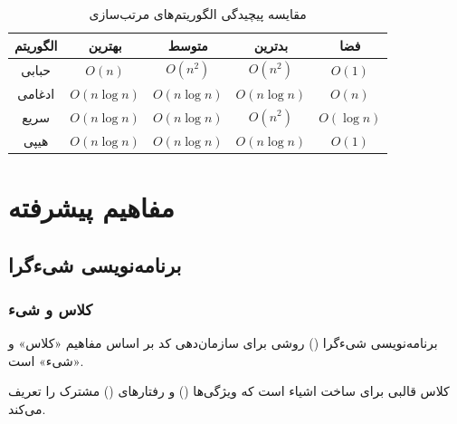 \documentclass{matinbook}
\begin{document}
\begin{table}[h]
\centering
\caption{مقایسه پیچیدگی الگوریتم‌های مرتب‌سازی}
\label{tab:sorting-comparison}
\begin{tabular}{|c|c|c|c|c|}
\hline
\textbf{الگوریتم} & \textbf{بهترین} & \textbf{متوسط} & \textbf{بدترین} & \textbf{فضا} \\
\hline
حبابی & $O(n)$ & $O(n^2)$ & $O(n^2)$ & $O(1)$ \\
ادغامی & $O(n \log n)$ & $O(n \log n)$ & $O(n \log n)$ & $O(n)$ \\
سریع & $O(n \log n)$ & $O(n \log n)$ & $O(n^2)$ & $O(\log n)$ \\
هیپی & $O(n \log n)$ & $O(n \log n)$ & $O(n \log n)$ & $O(1)$ \\
\hline
\end{tabular}
\end{table}

\part{مفاهیم پیشرفته}

\chapter{برنامه‌نویسی شیءگرا}
\label{chap:oop}

\section{کلاس و شیء}

برنامه‌نویسی شیءگرا
() روشی برای سازمان‌دهی کد
بر اساس مفاهیم «کلاس» و «شیء»
است.

\begin{definition}[کلاس]
    کلاس قالبی برای ساخت اشیاء است
    که ویژگی‌ها () و رفتارهای
    () مشترک را تعریف می‌کند.
    \label{def:class}
\end{definition}
\end{document}
